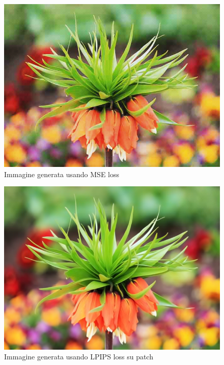 \begin{figure}[h]
      \includegraphics[scale=0.5]{img/flower_512_MSE.png}
      \caption{Immagine generata usando MSE loss}
      \centering
\end{figure}


\begin{figure}[h]
      \includegraphics[scale=0.5]{img/flower_512_patches64px.png}
      \caption{Immagine generata usando LPIPS loss su patch}
      \centering
\end{figure}


